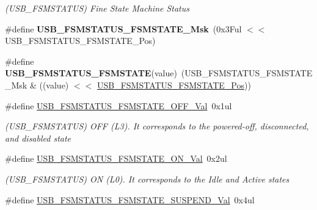 \begin{DoxyCompactItemize}
\begin{DoxyCompactList}\small\item\em (U\+S\+B\+\_\+\+F\+S\+M\+S\+T\+A\+T\+U\+S) Fine State Machine Status \end{DoxyCompactList}\item 
\hypertarget{group___s_a_m_l21___u_s_b_ga964bc6b8041c875d63b4b0d8a9c27e5c}{}\#define {\bfseries U\+S\+B\+\_\+\+F\+S\+M\+S\+T\+A\+T\+U\+S\+\_\+\+F\+S\+M\+S\+T\+A\+T\+E\+\_\+\+Msk}~(0x3\+Ful $<$$<$ U\+S\+B\+\_\+\+F\+S\+M\+S\+T\+A\+T\+U\+S\+\_\+\+F\+S\+M\+S\+T\+A\+T\+E\+\_\+\+Pos)\label{group___s_a_m_l21___u_s_b_ga964bc6b8041c875d63b4b0d8a9c27e5c}

\item 
\hypertarget{group___s_a_m_l21___u_s_b_ga03d3475c96c5c11d418446d5506c66c0}{}\#define {\bfseries U\+S\+B\+\_\+\+F\+S\+M\+S\+T\+A\+T\+U\+S\+\_\+\+F\+S\+M\+S\+T\+A\+T\+E}(value)~(U\+S\+B\+\_\+\+F\+S\+M\+S\+T\+A\+T\+U\+S\+\_\+\+F\+S\+M\+S\+T\+A\+T\+E\+\_\+\+Msk \& ((value) $<$$<$ \hyperlink{group___s_a_m_l21___u_s_b_ga1584eb0083050e0e37701f538d71c143}{U\+S\+B\+\_\+\+F\+S\+M\+S\+T\+A\+T\+U\+S\+\_\+\+F\+S\+M\+S\+T\+A\+T\+E\+\_\+\+Pos}))\label{group___s_a_m_l21___u_s_b_ga03d3475c96c5c11d418446d5506c66c0}

\item 
\hypertarget{group___s_a_m_l21___u_s_b_ga3b573bcca8d34cfbfb9c47640132e311}{}\#define \hyperlink{group___s_a_m_l21___u_s_b_ga3b573bcca8d34cfbfb9c47640132e311}{U\+S\+B\+\_\+\+F\+S\+M\+S\+T\+A\+T\+U\+S\+\_\+\+F\+S\+M\+S\+T\+A\+T\+E\+\_\+\+O\+F\+F\+\_\+\+Val}~0x1ul\label{group___s_a_m_l21___u_s_b_ga3b573bcca8d34cfbfb9c47640132e311}

\begin{DoxyCompactList}\small\item\em (U\+S\+B\+\_\+\+F\+S\+M\+S\+T\+A\+T\+U\+S) O\+F\+F (L3). It corresponds to the powered-\/off, disconnected, and disabled state \end{DoxyCompactList}\item 
\hypertarget{group___s_a_m_l21___u_s_b_gaf34bb78c6900252526f038e131f70312}{}\#define \hyperlink{group___s_a_m_l21___u_s_b_gaf34bb78c6900252526f038e131f70312}{U\+S\+B\+\_\+\+F\+S\+M\+S\+T\+A\+T\+U\+S\+\_\+\+F\+S\+M\+S\+T\+A\+T\+E\+\_\+\+O\+N\+\_\+\+Val}~0x2ul\label{group___s_a_m_l21___u_s_b_gaf34bb78c6900252526f038e131f70312}

\begin{DoxyCompactList}\small\item\em (U\+S\+B\+\_\+\+F\+S\+M\+S\+T\+A\+T\+U\+S) O\+N (L0). It corresponds to the Idle and Active states \end{DoxyCompactList}\item 
\hypertarget{group___s_a_m_l21___u_s_b_ga11570ce95d207d25017664abe9a39561}{}\#define \hyperlink{group___s_a_m_l21___u_s_b_ga11570ce95d207d25017664abe9a39561}{U\+S\+B\+\_\+\+F\+S\+M\+S\+T\+A\+T\+U\+S\+\_\+\+F\+S\+M\+S\+T\+A\+T\+E\+\_\+\+S\+U\+S\+P\+E\+N\+D\+\_\+\+Val}~0x4ul\label{group___s_a_m_l21___u_s_b_ga11570ce95d207d25017664abe9a39561}


\end{DoxyCompactItemize}
